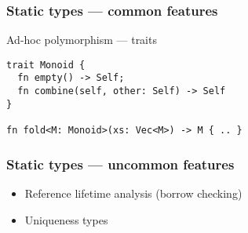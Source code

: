 \documentclass[t]{beamer}
\begin{document}
\begin{frame}[c,fragile]
\frametitle{Static types --- common features}

\begin{block}{Ad-hoc polymorphism --- traits}
\begin{verbatim}
trait Monoid {
  fn empty() -> Self;
  fn combine(self, other: Self) -> Self
}

fn fold<M: Monoid>(xs: Vec<M>) -> M { .. }
\end{verbatim}
\end{block}

\end{frame}


\begin{frame}[c,fragile]
\frametitle{Static types --- uncommon features}

\begin{itemize}
\item Reference lifetime analysis (borrow checking)
\item Uniqueness types
\end{itemize}

\end{frame}
\end{document}
